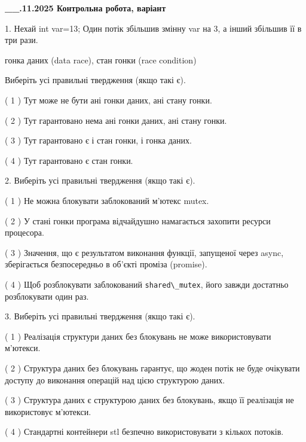 \documentclass[12pt, ukrainian]{article}
\def\code#1{\Verb!#1!}
\begin{document}
\newpage
\begin {large}

\textbf{\_\_.11.2025 Контрольна робота, варіант  }\par


{
1. Нехай int var=13; Один потік збільшив змінну var на 3, а інший збільшив її в три рази.

гонка даних (data race), стан гонки (race condition)

Виберіть усі правильні твердження (якщо такі є).\par
\vspace{2mm}
( 1 ) Тут може не бути ані гонки даних, ані стану гонки.%

( 2 ) Тут гарантовано нема ані гонки даних, ані стану гонки.%

( 3 ) Тут гарантовано є і стан гонки, і гонка даних.%

( 4 ) Тут гарантовано є стан гонки.%


2. Виберіть усі правильні твердження (якщо такі є).\par
\vspace{2mm}

( 1 ) Не можна блокувати заблокований м’ютекс mutex.%

( 2 ) У стані гонки програма відчайдушно намагається захопити ресурси процесора.%

( 3 ) Значення, що є результатом виконання функції, запущеної через async, зберігається безпосередньо в об’єкті проміза (promise).%

( 4 ) Щоб розблокувати заблокований \code{shared\_mutex}, його завжди достатньо розблокувати один раз.%


3. Виберіть усі правильні твердження (якщо такі є).\par
\vspace{2mm}

( 1 ) Реалізація структури даних без блокувань не може використовувати м’ютекси.%

( 2 ) Структура даних без блокувань гарантує, що жоден потік не буде очікувати доступу до виконання операцій над цією структурою даних.%

( 3 ) Структура даних є структурою даних без блокувань, якщо її реалізація не використовує м’ютекси.%

( 4 ) Стандартні контейнери stl безпечно використовувати з кількох потоків.%


}
\end{large}
\end{document}
